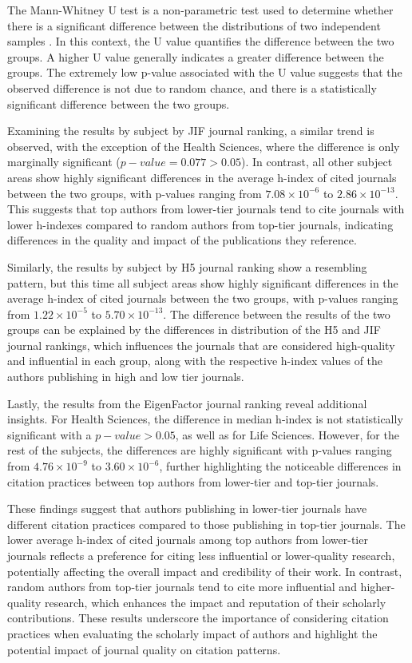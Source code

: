 The Mann-Whitney U test is a non-parametric test used to determine whether
there is a significant difference between the distributions of two independent
samples \cite{mann1947test}. In this context, the U value quantifies the
difference between the two groups. A higher U value generally indicates a
greater difference between the groups. The extremely low p-value associated
with the U value suggests that the observed difference is not due to random
chance, and there is a statistically significant difference between the two
groups.

Examining the results by subject by JIF journal ranking, a similar trend is
observed, with the exception of the Health Sciences, where the difference is
only marginally significant ($p-value = 0.077 > 0.05$). In contrast, all 
other subject areas show highly significant
differences in the average h-index of cited journals between the two groups,
with p-values ranging from $7.08 \times 10^{-6}$ to $2.86 \times 10^{-13}$.
This suggests that top authors from lower-tier journals tend to cite journals
with lower h-indexes compared to random authors from top-tier journals,
indicating differences in the quality and impact of the publications they
reference.

Similarly, the results by subject by H5 journal ranking show a resembling pattern,
but this time all subject areas show highly significant differences in the
average h-index of cited journals between the two groups, with p-values ranging
from $1.22 \times 10^{-5}$ to $5.70 \times 10^{-13}$. The difference between
the results of the two groups can be explained by the differences in
distribution of the H5 and JIF journal rankings, which influences the journals
that are considered high-quality and influential in each group, along with the
respective h-index values of the authors publishing in high and low tier
journals.

Lastly, the results from the EigenFactor journal ranking reveal additional
insights. For Health Sciences, the difference in median h-index is not
statistically significant with a $p-value > 0.05$, as well as for Life
Sciences. However, for the rest of the subjects, the differences are highly
significant with p-values ranging from $4.76 \times 10^{-9}$ to $3.60 \times
    10^{-6}$, further highlighting the noticeable differences in citation
practices between top authors from lower-tier and top-tier journals.

These findings suggest that authors publishing in lower-tier journals have
different citation practices compared to those publishing in top-tier journals.
The lower average h-index of cited journals among top authors from lower-tier
journals reflects a preference for citing less influential or lower-quality
research, potentially affecting the overall impact and credibility of their
work. In contrast, random authors from top-tier journals tend to cite more
influential and higher-quality research, which enhances the impact and
reputation of their scholarly contributions. These results underscore the
importance of considering citation practices when evaluating the scholarly
impact of authors and highlight the potential impact of journal quality on
citation patterns.

